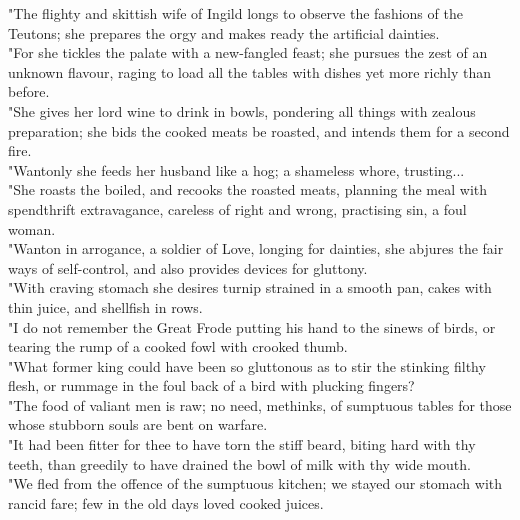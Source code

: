 \documentclass[10pt,a4paper]{report}
\begin{document}
"The flighty and skittish wife of Ingild longs to observe the fashions of the Teutons; she prepares the orgy and makes ready the artificial dainties.\\

"For she tickles the palate with a new-fangled feast; she pursues the zest of an unknown flavour, raging to load all the tables with dishes yet more richly than before.\\

"She gives her lord wine to drink in bowls, pondering all things with zealous preparation; she bids the cooked meats be roasted, and intends them for a second fire.\\

"Wantonly she feeds her husband like a hog; a shameless whore, trusting...\\

"She roasts the boiled, and recooks the roasted meats, planning the meal with spendthrift extravagance, careless of right and wrong, practising sin, a foul woman.\\

"Wanton in arrogance, a soldier of Love, longing for dainties, she abjures the fair ways of self-control, and also provides devices for gluttony.\\

"With craving stomach she desires turnip strained in a smooth pan, cakes with thin juice, and shellfish in rows.\\

"I do not remember the Great Frode putting his hand to the sinews of birds, or tearing the rump of a cooked fowl with crooked thumb.\\

"What former king could have been so gluttonous as to stir the stinking filthy flesh, or rummage in the foul back of a bird with plucking fingers?\\

"The food of valiant men is raw; no need, methinks, of sumptuous tables for those whose stubborn souls are bent on warfare.\\

"It had been fitter for thee to have torn the stiff beard, biting hard with thy teeth, than greedily to have drained the bowl of milk with thy wide mouth.\\

"We fled from the offence of the sumptuous kitchen; we stayed our stomach with rancid fare; few in the old days loved cooked juices.\\
\end{document}
